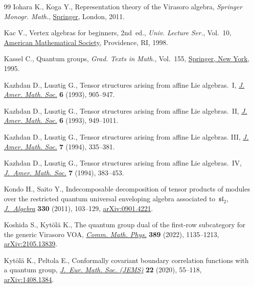 \begin{thebibliography}{99}
Iohara K., Koga Y., Representation theory of the {V}irasoro algebra, \textit{Springer
 Monogr. Math.}, \href{https://doi.org/10.1007/978-0-85729-160-8}{Springer}, London, 2011.

Kac V., Vertex algebras for beginners, 2nd~ed.,  \textit{Univ. Lecture Ser.}, Vol.~10, \href{https://doi.org/10.1090/ulect/010}{American Mathematical
 Society}, Providence, RI, 1998.

Kassel C., Quantum groups, \textit{Grad. Texts in Math.}, Vol.~155,
 \href{https://doi.org/10.1007/978-1-4612-0783-2}{Springer, New York}, 1995.

Kazhdan D., Lusztig G., Tensor structures arising from affine {L}ie
 algebras.~{I}, \href{https://doi.org/10.2307/2152745}{\textit{J. Amer. Math.
 Soc.}} \textbf{6} (1993), 905--947.

Kazhdan D., Lusztig G., Tensor structures arising from affine {L}ie
 algebras.~{II}, \href{https://doi.org/10.2307/2152746}{\textit{J. Amer. Math.
 Soc.}} \textbf{6} (1993), 949--1011.

Kazhdan D., Lusztig G., Tensor structures arising from affine {L}ie algebras.
 {III}, \href{https://doi.org/10.2307/2152762}{\textit{J. Amer. Math. Soc.}}
 \textbf{7} (1994), 335--381.

Kazhdan D., Lusztig G., Tensor structures arising from affine {L}ie
 algebras.~{IV}, \href{https://doi.org/10.2307/2152763}{\textit{J.~Amer. Math.
 Soc.}} \textbf{7} (1994), 383--453.

Kondo H., Saito Y., Indecomposable decomposition of tensor products of modules
 over the restricted quantum universal enveloping algebra associated
 to~{${\mathfrak{sl}}_2$},
 \href{https://doi.org/10.1016/j.jalgebra.2011.01.010}{\textit{J.~Algebra}}
 \textbf{330} (2011), 103--129,
 \href{http://arxiv.org/abs/0901.4221}{arXiv:0901.4221}.

Koshida S., Kyt\"ol\"a K., The quantum group dual of the first-row subcategory
 for the generic {V}irasoro {VOA},
 \href{https://doi.org/10.1007/s00220-021-04266-w}{\textit{Comm. Math. Phys.}}
 \textbf{389} (2022), 1135--1213,
 \href{http://arxiv.org/abs/2105.13839}{arXiv:2105.13839}.

Kyt\"ol\"a K., Peltola E., Conformally covariant boundary correlation functions
 with a quantum group, \href{https://doi.org/10.4171/jems/917}{\textit{J.~Eur.
 Math. Soc. (JEMS)}} \textbf{22} (2020), 55--118,
 \href{http://arxiv.org/abs/1408.1384}{arXiv:1408.1384}.


\end{thebibliography}
